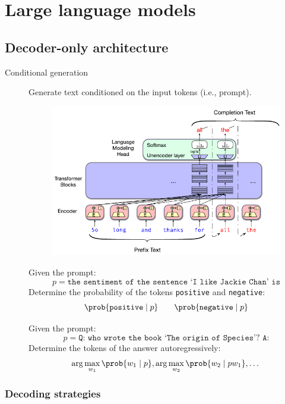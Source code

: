 \chapter{Large language models}



\section{Decoder-only architecture} \label{sec:llm}

\begin{description}
    \item[Conditional generation] 
        Generate text conditioned on the input tokens (i.e., prompt).

        \begin{figure}[H]
            \centering
            \includegraphics[width=0.45\linewidth]{./img/_conditional_generation.pdf}
        \end{figure}

        \begin{example}
            Given the prompt:
            \[ p = \texttt{the sentiment of the sentence `I like Jackie Chan' is} \]
            Determine the probability of the tokens \texttt{positive} and \texttt{negative}:
            \[
                \prob{\texttt{positive} \mid p} \qquad \prob{\texttt{negative} \mid p}
            \]
        \end{example}

        \begin{example}
            Given the prompt:
            \[ p = \texttt{Q: who wrote the book `The origin of Species'? A:} \]
            Determine the tokens of the answer autoregressively:
            \[
                \arg\max_{w_1} \prob{w_1 \mid p}, \arg\max_{w_2} \prob{w_2 \mid pw_1}, \dots
            \]
        \end{example}
\end{description}


\subsection{Decoding strategies}

